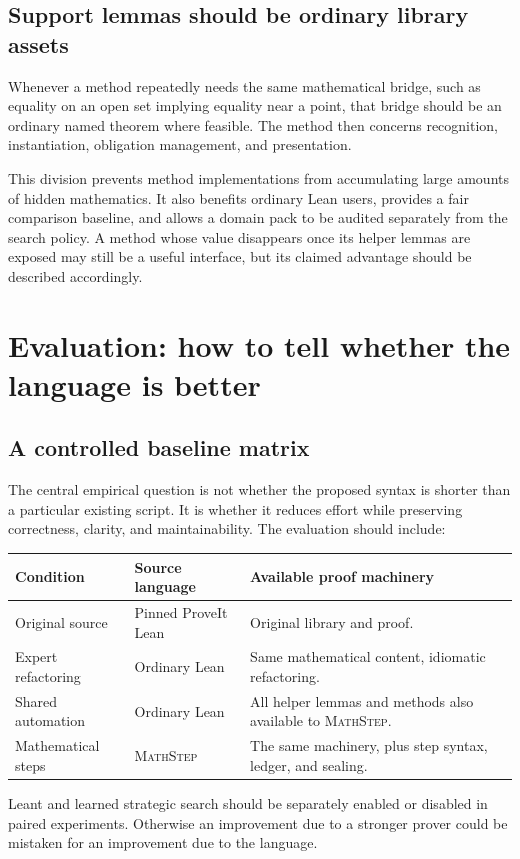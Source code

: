 \documentclass[11pt,a4paper]{article}
\theoremstyle{remark}
\newcommand{\ms}{\textsc{MathStep}}
\begin{document}
\subsection{Support lemmas should be ordinary library assets}
Whenever a method repeatedly needs the same mathematical bridge, such as equality on an open set implying equality near a point, that bridge should be an ordinary named theorem where feasible. The method then concerns recognition, instantiation, obligation management, and presentation.

This division prevents method implementations from accumulating large amounts of hidden mathematics. It also benefits ordinary Lean users, provides a fair comparison baseline, and allows a domain pack to be audited separately from the search policy. A method whose value disappears once its helper lemmas are exposed may still be a useful interface, but its claimed advantage should be described accordingly.

\section{Evaluation: how to tell whether the language is better}\label{sec:evaluation}

\subsection{A controlled baseline matrix}
The central empirical question is not whether the proposed syntax is shorter than a particular existing script. It is whether it reduces effort while preserving correctness, clarity, and maintainability. The evaluation should include:
\begin{center}
\begin{tabularx}{\linewidth}{@{}L{.23\linewidth}YY@{}}
\toprule
Condition & Source language & Available proof machinery\\
\midrule
Original source & Pinned ProveIt Lean & Original library and proof.\\[3pt]
Expert refactoring & Ordinary Lean & Same mathematical content, idiomatic refactoring.\\[3pt]
Shared automation & Ordinary Lean & All helper lemmas and methods also available to \ms.\\[3pt]
Mathematical steps & \ms & The same machinery, plus step syntax, ledger, and sealing.\\
\bottomrule
\end{tabularx}
\end{center}
Leant and learned strategic search should be separately enabled or disabled in paired experiments. Otherwise an improvement due to a stronger prover could be mistaken for an improvement due to the language.
\end{document}
